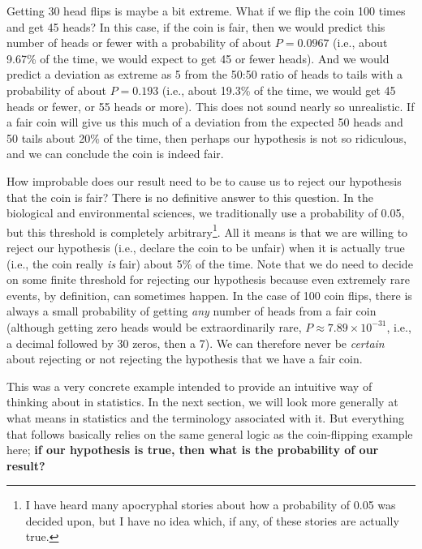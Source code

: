 \documentclass[
  openany]{krantz}
\begin{document}
Getting 30 head flips is maybe a bit extreme.
What if we flip the coin 100 times and get 45 heads?
In this case, if the coin is fair, then we would predict this number of heads or fewer with a probability of about \(P = 0.0967\) (i.e., about 9.67\% of the time, we would expect to get 45 or fewer heads).
And we would predict a deviation as extreme as 5 from the 50:50 ratio of heads to tails with a probability of about \(P = 0.193\) (i.e., about 19.3\% of the time, we would get 45 heads or fewer, or 55 heads or more).
This does not sound nearly so unrealistic.
If a fair coin will give us this much of a deviation from the expected 50 heads and 50 tails about 20\% of the time, then perhaps our hypothesis is not so ridiculous, and we can conclude the coin is indeed fair.

\newpage

How improbable does our result need to be to cause us to reject our hypothesis that the coin is fair?
There is no definitive answer to this question.
In the biological and environmental sciences, we traditionally use a probability of 0.05, but this threshold is completely arbitrary\footnote{I have heard many apocryphal stories about how a probability of 0.05 was decided upon, but I have no idea which, if any, of these stories are actually true.}.
All it means is that we are willing to reject our hypothesis (i.e., declare the coin to be unfair) when it is actually true (i.e., the coin really \emph{is} fair) about 5\% of the time.
Note that we do need to decide on some finite threshold for rejecting our hypothesis because even extremely rare events, by definition, can sometimes happen.
In the case of 100 coin flips, there is always a small probability of getting \emph{any} number of heads from a fair coin (although getting zero heads would be extraordinarily rare, \(P \approx 7.89 \times 10^{-31}\), i.e., a decimal followed by 30 zeros, then a 7).
We can therefore never be \emph{certain} about rejecting or not rejecting the hypothesis that we have a fair coin.

This was a very concrete example intended to provide an intuitive way of thinking about  in statistics.
In the next section, we will look more generally at what  means in statistics and the terminology associated with it.
But everything that follows basically relies on the same general logic as the coin-flipping example here; \textbf{if our hypothesis is true, then what is the probability of our result?}
\end{document}
